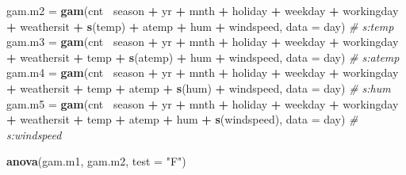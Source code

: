 \documentclass[]{article}
\newenvironment{Shaded}{\begin{snugshade}}{\end{snugshade}}
\newcommand{\KeywordTok}[1]{\textcolor[rgb]{0.13,0.29,0.53}{\textbf{#1}}}
\newcommand{\DataTypeTok}[1]{\textcolor[rgb]{0.13,0.29,0.53}{#1}}
\newcommand{\StringTok}[1]{\textcolor[rgb]{0.31,0.60,0.02}{#1}}
\newcommand{\CommentTok}[1]{\textcolor[rgb]{0.56,0.35,0.01}{\textit{#1}}}
\newcommand{\OperatorTok}[1]{\textcolor[rgb]{0.81,0.36,0.00}{\textbf{#1}}}
\newcommand{\NormalTok}[1]{#1}
\begin{document}
\begin{Shaded}
\begin{Highlighting}[]
\NormalTok{gam.m2 =}\StringTok{ }\KeywordTok{gam}\NormalTok{(cnt}\OperatorTok{~}\StringTok{ }\NormalTok{season }\OperatorTok{+}\StringTok{ }\NormalTok{yr }\OperatorTok{+}\StringTok{ }\NormalTok{mnth }\OperatorTok{+}\StringTok{ }\NormalTok{holiday }\OperatorTok{+}\StringTok{ }\NormalTok{weekday }\OperatorTok{+}\StringTok{ }\NormalTok{workingday }\OperatorTok{+}\StringTok{ }\NormalTok{weathersit }\OperatorTok{+}\StringTok{ }\KeywordTok{s}\NormalTok{(temp) }\OperatorTok{+}\StringTok{ }\NormalTok{atemp }\OperatorTok{+}\StringTok{ }\NormalTok{hum }\OperatorTok{+}\StringTok{ }\NormalTok{windspeed, }\DataTypeTok{data =}\NormalTok{ day) }\CommentTok{# s:temp}
\NormalTok{gam.m3 =}\StringTok{ }\KeywordTok{gam}\NormalTok{(cnt}\OperatorTok{~}\StringTok{ }\NormalTok{season }\OperatorTok{+}\StringTok{ }\NormalTok{yr }\OperatorTok{+}\StringTok{ }\NormalTok{mnth }\OperatorTok{+}\StringTok{ }\NormalTok{holiday }\OperatorTok{+}\StringTok{ }\NormalTok{weekday }\OperatorTok{+}\StringTok{ }\NormalTok{workingday }\OperatorTok{+}\StringTok{ }\NormalTok{weathersit }\OperatorTok{+}\StringTok{ }\NormalTok{temp }\OperatorTok{+}\StringTok{ }\KeywordTok{s}\NormalTok{(atemp) }\OperatorTok{+}\StringTok{ }\NormalTok{hum }\OperatorTok{+}\StringTok{ }\NormalTok{windspeed, }\DataTypeTok{data =}\NormalTok{ day) }\CommentTok{# s:atemp}
\NormalTok{gam.m4 =}\StringTok{ }\KeywordTok{gam}\NormalTok{(cnt}\OperatorTok{~}\StringTok{ }\NormalTok{season }\OperatorTok{+}\StringTok{ }\NormalTok{yr }\OperatorTok{+}\StringTok{ }\NormalTok{mnth }\OperatorTok{+}\StringTok{ }\NormalTok{holiday }\OperatorTok{+}\StringTok{ }\NormalTok{weekday }\OperatorTok{+}\StringTok{ }\NormalTok{workingday }\OperatorTok{+}\StringTok{ }\NormalTok{weathersit }\OperatorTok{+}\StringTok{ }\NormalTok{temp }\OperatorTok{+}\StringTok{ }\NormalTok{atemp }\OperatorTok{+}\StringTok{ }\KeywordTok{s}\NormalTok{(hum) }\OperatorTok{+}\StringTok{ }\NormalTok{windspeed, }\DataTypeTok{data =}\NormalTok{ day) }\CommentTok{# s:hum}
\NormalTok{gam.m5 =}\StringTok{ }\KeywordTok{gam}\NormalTok{(cnt}\OperatorTok{~}\StringTok{ }\NormalTok{season }\OperatorTok{+}\StringTok{ }\NormalTok{yr }\OperatorTok{+}\StringTok{ }\NormalTok{mnth }\OperatorTok{+}\StringTok{ }\NormalTok{holiday }\OperatorTok{+}\StringTok{ }\NormalTok{weekday }\OperatorTok{+}\StringTok{ }\NormalTok{workingday }\OperatorTok{+}\StringTok{ }\NormalTok{weathersit }\OperatorTok{+}\StringTok{ }\NormalTok{temp }\OperatorTok{+}\StringTok{ }\NormalTok{atemp }\OperatorTok{+}\StringTok{ }\NormalTok{hum }\OperatorTok{+}\StringTok{ }\KeywordTok{s}\NormalTok{(windspeed), }\DataTypeTok{data =}\NormalTok{ day) }\CommentTok{# s:windspeed}

\KeywordTok{anova}\NormalTok{(gam.m1, gam.m2, }\DataTypeTok{test =} \StringTok{"F"}\NormalTok{)}
\end{Highlighting}
\end{Shaded}
\end{document}
